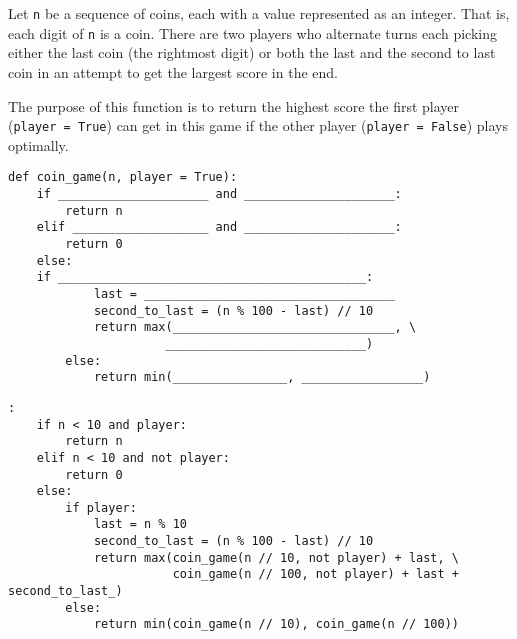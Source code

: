 \begin{blocksection}
\question Let \texttt{n} be a sequence of coins, each with a value represented as an integer. That is, each digit of \texttt{n} is a coin. There are two players who alternate turns each picking either the last coin (the rightmost digit) or both the last and the second to last coin in an attempt to get the largest score in the end. 

The purpose of this function is to return the highest score the first player (\texttt{player = True}) can get in this game if the other player (\texttt{player = False}) plays optimally. \\

\begin{lstlisting}
def coin_game(n, player = True):
    if _____________________ and _____________________:
        return n			
    elif ___________________ and _____________________:		
        return 0			
    else:
	if ___________________________________________:			
            last = ___________________________________			
            second_to_last = (n % 100 - last) // 10
            return max(_______________________________, \
		              ____________________________)
        else:	
            return min(________________, _________________)

\end{lstlisting}

\begin{solution}[1in]
\begin{lstlisting}:
    if n < 10 and player:
        return n
    elif n < 10 and not player:
        return 0
    else:
        if player:
            last = n % 10
            second_to_last = (n % 100 - last) // 10
            return max(coin_game(n // 10, not player) + last, \
                       coin_game(n // 100, not player) + last + second_to_last_)
        else:
            return min(coin_game(n // 10), coin_game(n // 100))

\end{lstlisting}
\end{solution}
\end{blocksection}
